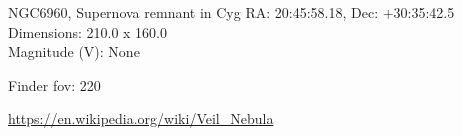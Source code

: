 \begin{block}{NGC6960, Supernova remnant in Cyg}
    RA: 20:45:58.18, Dec: +30:35:42.5 \\ 
    Dimensions: 210.0 x 160.0 \\ 
    Magnitude (V): None



    Finder fov: 220 

    \url{https://en.wikipedia.org/wiki/Veil_Nebula} 
\end{block}